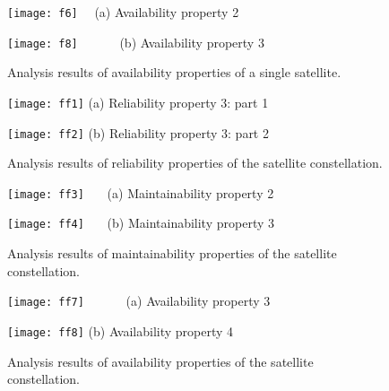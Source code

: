 \documentclass[preprint,12pt]{qrei}
\begin{document}
\begin{figure*}[ht]
\begin{minipage}[htbp]{0.5\linewidth}
\centering
\texttt{[image: f6]}
\footnotesize{\ \ (a) Availability property 2}
\end{minipage}
\begin{minipage}[htbp]{0.5\linewidth}
\centering
\texttt{[image: f8]}
\footnotesize{\ \ \ \ \ \ (b) Availability property 3}
\end{minipage}
\caption{Analysis results of availability properties of a single satellite.}
\label{fig:three}
\end{figure*}

\begin{figure*}[ht]
\begin{minipage}[htbp]{0.5\linewidth}
\centering
\texttt{[image: ff1]}
\footnotesize{(a) Reliability property 3: part 1}
\end{minipage}
\begin{minipage}[htbp]{0.5\linewidth}
\centering
\texttt{[image: ff2]}
\footnotesize{(b) Reliability property 3: part 2}
\end{minipage}
\caption{Analysis results of reliability properties of the satellite constellation.}
\label{fig:four}
\end{figure*}

\begin{figure*}[ht]
\begin{minipage}[htbp]{0.5\linewidth}
\centering
\texttt{[image: ff3]}
\footnotesize{\ \ \ (a) Maintainability property 2}
\end{minipage}
\begin{minipage}[htbp]{0.5\linewidth}
\centering
\texttt{[image: ff4]}
\footnotesize{\ \ \ (b) Maintainability property 3}
\end{minipage}
\caption{Analysis results of maintainability properties of the satellite constellation.}
\label{fig:five}
\end{figure*}

\begin{figure*}[ht]
\begin{minipage}[htbp]{0.5\linewidth}
\centering
\texttt{[image: ff7]}
\footnotesize{\ \ \ \ \ \ (a) Availability property 3}
\end{minipage}
\begin{minipage}[htbp]{0.5\linewidth}
\centering
\texttt{[image: ff8]}
\footnotesize{(b) Availability property 4}
\end{minipage}
\caption{Analysis results of availability properties of the satellite constellation.}
\label{fig:six}
\end{figure*}
\end{document}
